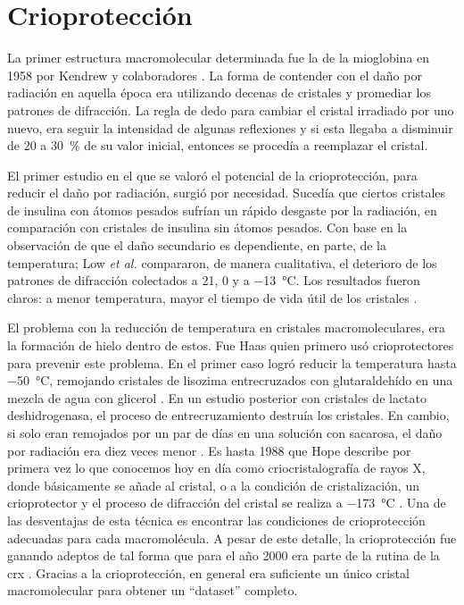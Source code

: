 \section{Crioprotección}
La primer estructura macromolecular determinada fue la de la mioglobina en 1958 por Kendrew y colaboradores . La forma de contender con el daño por radiación en aquella época era utilizando decenas de cristales y promediar los patrones de difracción. La regla de dedo para cambiar el cristal irradiado por uno nuevo, era seguir la intensidad de algunas reflexiones y si esta llegaba a disminuir de \num{20} a \SI{30}{\percent} de su valor inicial, entonces se procedía a reemplazar el cristal. 

El primer estudio en el que se valoró el potencial de la crioprotección, para reducir el daño por radiación, surgió por necesidad. Sucedía que ciertos cristales de insulina con átomos pesados sufrían un rápido desgaste por la radiación, en comparación con cristales de insulina sin átomos pesados. Con base en la observación de que el daño secundario es dependiente, en parte, de la temperatura; Low \emph{et al.} compararon, de manera cualitativa, el deterioro de los patrones de difracción colectados a \num{21}, \num{0} y a \SI{-13}{\celsius}. Los resultados fueron claros: a menor temperatura, mayor el tiempo de vida útil de los cristales  . 

El problema con la reducción de temperatura en cristales macromoleculares, era la formación de hielo dentro de estos. Fue Haas quien primero usó crioprotectores para prevenir este problema. En el primer caso logró reducir la temperatura hasta \SI{-50}{\celsius}, remojando cristales de lisozima entrecruzados con glutaraldehído
en una mezcla de agua con glicerol . En un estudio posterior con cristales de lactato deshidrogenasa, el proceso de entrecruzamiento destruía los cristales. En cambio, si solo eran remojados por un par de días en una solución con sacarosa, el daño por radiación era diez veces menor . 
Es hasta 1988 que Hope describe por primera vez lo que conocemos hoy en día como criocristalografía de rayos X, donde básicamente se añade al cristal, o a la condición de cristalización, un crioprotector y el proceso de difracción del cristal se realiza a \SI{-173}{\celsius} . Una de las desventajas de esta técnica es encontrar las condiciones de crioprotección adecuadas para cada macromolécula. A pesar de este detalle, la crioprotección fue ganando adeptos de tal forma
que para el año 2000 era parte de la rutina de la \acrshort{crx} . Gracias a la crioprotección, en general era suficiente un único cristal macromolecular para obtener un
\enquote{dataset} completo.


